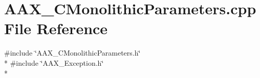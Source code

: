 \hypertarget{a00177}{}\section{A\+A\+X\+\_\+\+C\+Monolithic\+Parameters.\+cpp File Reference}
\label{a00177}
{\ttfamily \#include \char`\"{}A\+A\+X\+\_\+\+C\+Monolithic\+Parameters.\+h\char`\"{}}\\*
{\ttfamily \#include \char`\"{}A\+A\+X\+\_\+\+Exception.\+h\char`\"{}}\\*
